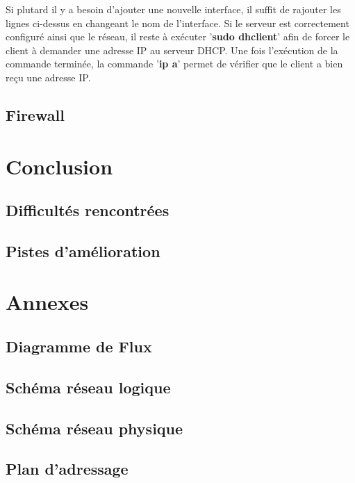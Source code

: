\documentclass[a4paper,12pt]{report}
\begin{document}
            Si plutard il y a besoin d'ajouter une nouvelle interface, il suffit de rajouter les lignes ci-dessus en changeant le nom de l'interface.
            Si le serveur est correctement configuré ainsi que le réseau, il reste à exécuter '\textbf{sudo dhclient}' afin de forcer le client à demander une adresse IP au serveur DHCP.
            Une fois l'exécution de la commande terminée, la commande '\textbf{ip a}' permet de vérifier que le client a bien reçu une adresse IP.

        \section{Firewall}
        \section{}


    \chapter{Conclusion}
        \section{Difficultés rencontrées}
        \section{Pistes d'amélioration}

    \chapter*{Annexes}
        \section{Diagramme de Flux}
        \section{Schéma réseau logique}
        \section{Schéma réseau physique}
        \section{Plan d'adressage}
        
\end{document}
